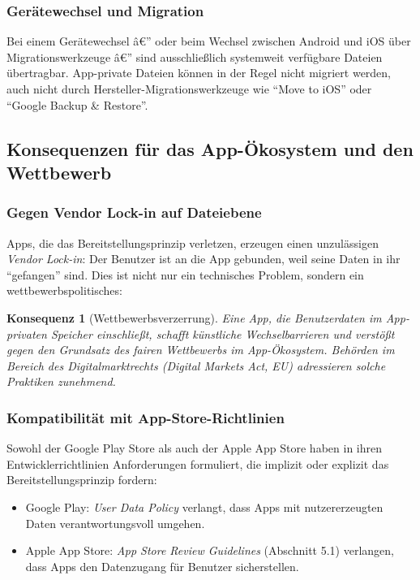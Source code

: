 ﻿\documentclass[12pt, a4paper]{article}
\newtheorem{konsequenz}[definition]{Konsequenz}
\begin{document}
\subsubsection{Gerätewechsel und Migration}

Bei einem Gerätewechsel â€” oder beim Wechsel zwischen Android und iOS über
Migrationswerkzeuge â€” sind ausschließlich systemweit verfügbare Dateien übertragbar.
App-private Dateien können in der Regel nicht migriert werden, auch nicht durch
Hersteller-Migrationswerkzeuge wie \enquote{Move to iOS} oder \enquote{Google
Backup \& Restore}.

\subsection{Konsequenzen für das App-Ökosystem und den Wettbewerb}

\subsubsection{Gegen Vendor Lock-in auf Dateiebene}

Apps, die das Bereitstellungsprinzip verletzen, erzeugen einen unzulässigen
\emph{Vendor Lock-in}: Der Benutzer ist an die App gebunden, weil seine Daten
in ihr \enquote{gefangen} sind. Dies ist nicht nur ein technisches Problem,
sondern ein wettbewerbspolitisches:

\begin{konsequenz}[Wettbewerbsverzerrung]
Eine App, die Benutzerdaten im App-privaten Speicher einschließt, schafft
künstliche Wechselbarrieren und verstößt gegen den Grundsatz des fairen
Wettbewerbs im App-Ökosystem. Behörden im Bereich des Digitalmarktrechts
(Digital Markets Act, EU) adressieren solche Praktiken zunehmend.
\end{konsequenz}

\subsubsection{Kompatibilität mit App-Store-Richtlinien}

Sowohl der Google Play Store als auch der Apple App Store haben in ihren
Entwicklerrichtlinien Anforderungen formuliert, die implizit oder explizit
das Bereitstellungsprinzip fordern:

\begin{itemize}[leftmargin=*]
  \item Google Play: \emph{User Data Policy} verlangt, dass Apps mit nutzererzeugten
    Daten verantwortungsvoll umgehen.
  \item Apple App Store: \emph{App Store Review Guidelines} (Abschnitt 5.1)
    verlangen, dass Apps den Datenzugang für Benutzer sicherstellen.
\end{itemize}
\end{document}
